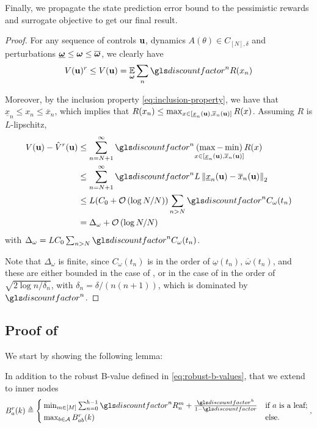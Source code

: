 \begin{subappendices}
	
	Finally, we propagate the state prediction error bound to the pessimistic rewards and surrogate objective to get our final result.
	\begin{proof}
		
		For any sequence of controls $\mathbf{u}$, dynamics $A(\theta)\in C_{[N],\delta}$ and perturbations $\underline{\bm{\omega}} \leq \bm{\omega} \leq \overline{\bm{\omega}}$, we clearly have 
		\[V(\bu)^r \leq V(\bu) = \expectedvalue_{\bom}\sum_n \discount^n R(x_n)\]
		
		Moreover, by the inclusion property \eqref{eq:inclusion-property}, we have that $\underline{x}_n \leq x_n \leq \overline{x}_n$, which implies that $R(x_n) \leq \max_{x\in[\underline{x}_n(\mathbf{u}), \overline{x}_n(\mathbf{u})]}  R(x)$. Assuming $R$ is $L$-lipschitz,
		\begin{align*}
		V(\bu) - \hat{V}^r(\bu) &\leq \sum_{n=N+1}^\infty \discount^n \underset{{x\in[\underline{x}_n(\bu), \overline{x}_n(\bu)]}}{(\max - \min)} R(x)\\
		&\leq \sum_{n=N+1}^\infty \discount^n L \left\|\underline{x}_n(\bu) - \overline{x}_n(\bu)\right\|_2\\
		&\leq L(C_0 + \cO\left({\log N / N}\right)) \sum_{n>N} \discount^n C_{\omega}(t_n)\\
		&= \Delta_\omega + \cO\left({\log N / N}\right)
		\end{align*}
		with $\Delta_\omega = L C_0\sum_{n>N} \discount^n C_{\omega}(t_n)$.
		
		Note that $\Delta_\omega$ is finite, since $C_{\omega}(t_n)$ is in the order of $\underline{\omega}(t_n)$, $\overline{\omega}(t_n)$, and these are either bounded in the case of , or in the case of  in the order of $\sqrt{2\log n / \delta_n}$, with $\delta_n = \delta/(n(n+1))$, which is dominated by $\discount^n$.
	\end{proof}
	
	
	\subsection{Proof of }
	
	We start by showing the following lemma:
	
	
	\begin{lemma}
		\label{lemma:uvb}
		\begin{leftbar}[lemmabar]
		In addition to the robust B-value defined in \eqref{eq:robust-b-values}, that we extend to inner nodes	
		\begin{equation}
		\label{eq:br}
		B_a^r(k)  \eqdef
		\begin{cases}
		\min_{m\in[M]} \sum_{n=0}^{h-1} \discount^n R_n^m  + \frac{\discount^h}{1-\discount}&\text{if } a \text{ is a leaf;}\\
		\max_{b\in\mathcal{A}} B_{ab}^r(k) & \text{else.}
		\end{cases},
		\end{equation}
		

\end{leftbar}
\end{lemma}
\end{subappendices}
